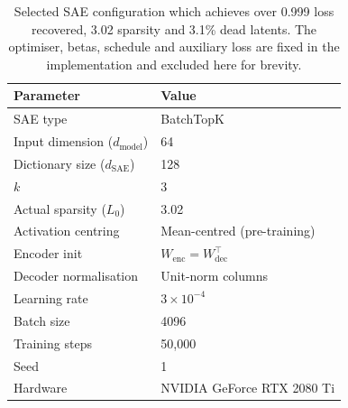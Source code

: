 \begin{table}[h]
\caption{Selected SAE configuration which achieves over 0.999 loss recovered, 3.02 sparsity and 3.1\% dead latents. The optimiser, betas, schedule and auxiliary loss are fixed in the implementation \cite{marks2024dictionary_learning} and excluded here for brevity.}
\label{tab:sae_config}
\centering
\setlength{\tabcolsep}{2pt}
\begin{tabular}{ll}
\toprule
\textbf{Parameter} & \textbf{Value} \\
\midrule
SAE type & BatchTopK \\
Input dimension ($d_{\text{model}}$) & 64 \\
Dictionary size ($d_{\text{SAE}}$) & 128 \\
$k$ & 3 \\
Actual sparsity ($L_0$) & 3.02 \\
Activation centring & Mean-centred (pre-training) \\
Encoder init & $W_{\text{enc}} = W_{\text{dec}}^\top$ \\
Decoder normalisation & Unit-norm columns \\
\midrule
Learning rate & $3 \times 10^{-4}$ \\
Batch size & 4096 \\
Training steps & 50{,}000 \\
Seed & 1 \\
\midrule
Hardware & NVIDIA GeForce RTX 2080 Ti \\
\bottomrule
\end{tabular}
\end{table}


